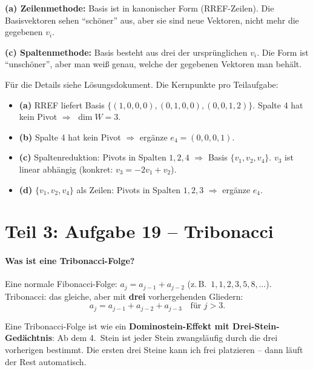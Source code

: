 \documentclass[a4paper,12pt]{article}
\begin{document}
\begin{merkbox}[title={Der Unterschied zwischen (a) und (c)}]
\textbf{(a) Zeilenmethode:} Basis ist in kanonischer Form (RREF-Zeilen). Die Basisvektoren sehen ``sch\"oner'' aus, aber sie sind neue Vektoren, nicht mehr die gegebenen $v_i$.

\medskip
\textbf{(c) Spaltenmethode:} Basis besteht aus drei der urspr\"unglichen $v_i$. Die Form ist ``unsch\"oner'', aber man wei\ss{} genau, welche der gegebenen Vektoren man beh\"alt.
\end{merkbox}

F\"ur die Details siehe L\"osungsdokument. Die Kernpunkte pro Teilaufgabe:

\begin{itemize}[leftmargin=*]
\item \textbf{(a)} RREF liefert Basis $\{(1,0,0,0), (0,1,0,0), (0,0,1,2)\}$. Spalte 4 hat kein Pivot $\Rightarrow$ $\dim W = 3$.
\item \textbf{(b)} Spalte 4 hat kein Pivot $\Rightarrow$ erg\"anze $e_4 = (0,0,0,1)$.
\item \textbf{(c)} Spaltenreduktion: Pivots in Spalten $1, 2, 4$ $\Rightarrow$ Basis $\{v_1, v_2, v_4\}$. $v_3$ ist linear abh\"angig (konkret: $v_3 = -2v_1 + v_2$).
\item \textbf{(d)} $\{v_1, v_2, v_4\}$ als Zeilen: Pivots in Spalten $1, 2, 3$ $\Rightarrow$ erg\"anze $e_4$.
\end{itemize}

\newpage

\part*{Teil 3: Aufgabe 19 -- Tribonacci}

\subsection*{Was ist eine Tribonacci-Folge?}

Eine normale Fibonacci-Folge: $a_j = a_{j-1} + a_{j-2}$ (z.\,B.\ $1, 1, 2, 3, 5, 8, \dots$). Tribonacci: das gleiche, aber mit \textbf{drei} vorhergehenden Gliedern:
\[
a_j = a_{j-1} + a_{j-2} + a_{j-3} \quad \text{f\"ur } j > 3.
\]

\begin{analogie}
Eine Tribonacci-Folge ist wie ein \textbf{Dominostein-Effekt mit Drei-Stein-Ged\"achtnis}: Ab dem 4.\ Stein ist jeder Stein zwangsl\"aufig durch die drei vorherigen bestimmt. Die ersten drei Steine kann ich frei platzieren -- dann l\"auft der Rest automatisch.
\end{analogie}
\end{document}
